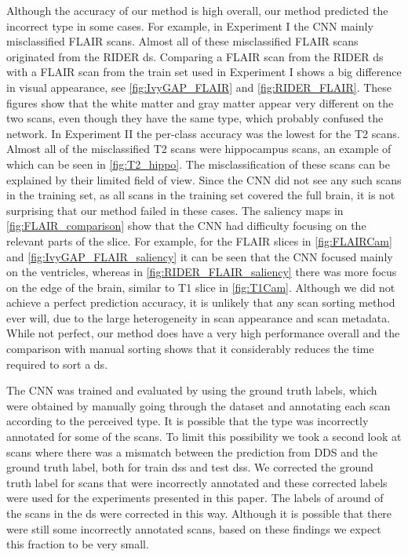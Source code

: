 Although the accuracy of our method is high overall, our method predicted the incorrect \gls{type} in some cases.
For example, in Experiment I the \gls{CNN} mainly misclassified \gls{FLAIR} \glspl{scan}.
Almost all of these misclassified \gls{FLAIR} \glspl{scan} originated from the \gls{RIDER} \gls{ds}.
Comparing a \gls{FLAIR} \gls{scan} from the \gls{RIDER} \gls{ds} with a \gls{FLAIR} \gls{scan} from the train set used in Experiment I shows a  big difference in visual appearance, see \cref{fig:IvyGAP_FLAIR} and \cref{fig:RIDER_FLAIR}.
These figures show that the white matter and gray matter appear very different on the two \glspl{scan}, even though they have the same \gls{type}, which probably confused the network.
In Experiment II the per-class accuracy was the lowest for the \gls{T2} \glspl{scan}.
Almost all of the misclassified \gls{T2} \glspl{scan} were hippocampus \glspl{scan}, an example of which can be seen in \cref{fig:T2_hippo}.
The misclassification of these \glspl{scan} can be explained by their limited field of view.
Since the \gls{CNN} did not see any such \glspl{scan} in the training set, as all \glspl{scan} in the training set covered the full brain, it is not surprising that our method failed in these cases.
The saliency maps in \cref{fig:FLAIR_comparison} show that the \gls{CNN} had difficulty focusing on the relevant parts of the \gls{slice}.
For example, for the \gls{FLAIR} \glspl{slice} in \cref{fig:FLAIRCam} and \cref{fig:IvyGAP_FLAIR_saliency} it can be seen that the \gls{CNN} focused mainly on the ventricles, whereas in \cref{fig:RIDER_FLAIR_saliency} there was more focus on the edge of the brain, similar to \gls{T1} \gls{slice} in \cref{fig:T1Cam}.
Although we did not achieve a perfect prediction accuracy, it is unlikely that any \gls{scan} sorting method ever will, due to the large heterogeneity in \gls{scan} appearance and \gls{scan} metadata.
While not perfect, our method does have a very high performance overall and the comparison with manual sorting shows that it considerably reduces the time required to sort a \gls{ds}.

The \gls{CNN} was trained and evaluated by using the ground truth labels, which were obtained by manually going through the dataset and annotating each \gls{scan} according to the perceived \gls{type}.
It is possible that the \gls{type} was incorrectly annotated for some of the \glspl{scan}.
To limit this possibility we took a second look at \glspl{scan} where there was a mismatch between the prediction from \gls{DDS} and the ground truth label, both for train \glspl{ds} and test \glspl{ds}.
We corrected the ground truth label for \glspl{scan} that were incorrectly annotated and these corrected labels were used for the experiments presented in this paper.
The labels of around  of the \glspl{scan} in the \gls{ds} were corrected in this way.
Although it is possible that there were still some incorrectly annotated \glspl{scan}, based on these findings we expect this fraction to be very small.


